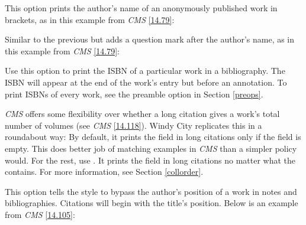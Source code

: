 \documentclass[11pt,letterpaper,oneside]{article}
\begin{document}
\begin{optionlist}


\noindent This option prints the author's name of an anonymously
published work in brackets, as in this example from \textit{CMS}
\ref{14.79}:

\begin{citebib}
\item \cite{horsley1796}
\end{citebib}


\noindent Similar to the previous but adds a question mark after the
author's name, as in this example from \textit{CMS} \ref{14.79}:

\begin{citebib}
\item \cite{hawkes1834}
\end{citebib}


\noindent Use this option to print the ISBN of a particular work in a
bibliography. The ISBN will appear at the end of the work's entry but
before an annotation. To print ISBNs of every work, see the
 preamble option in Section \ref{preops}.


\noindent \textit{CMS} offers some flexibility over whether a long
citation gives a work's total number of volumes (see \textit{CMS}
\ref{14.118}). Windy City replicates this in a roundabout way: By
default, it prints the  field in long citations only
if the  field is empty. This does better job of
matching examples in \textit{CMS} than a simpler policy would. For the
rest, use . It prints the  field in
long citations no matter what the  contains. For
more information, see Section \ref{collorder}.


\noindent This option tells the style to bypass the author's position
of a work in notes and bibliographies. Citations will begin with the
title's position. Below is an example from \textit{CMS} \ref{14.105}:

\begin{citebib}
\item \cite{chaucer1966}
\end{citebib}


\end{optionlist}
\end{document}
